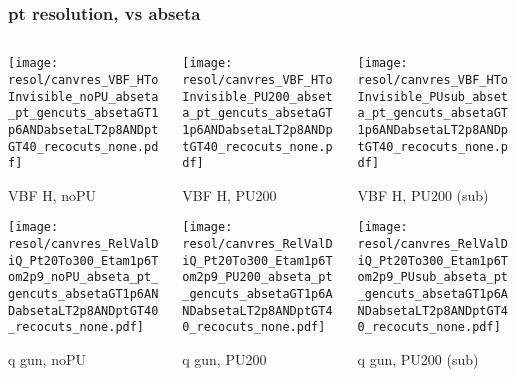 \documentclass[8pt]{beamer}
\begin{document}
  \begin{frame}
  \frametitle{pt resolution, vs abseta}
  
  \begin{columns}
   \begin{column}{0.35\textwidth}
     \texttt{[image: resol/canvres\_VBF\_HToInvisible\_noPU\_abseta\_pt\_gencuts\_absetaGT1p6ANDabsetaLT2p8ANDptGT40\_recocuts\_none.pdf]}
     
     VBF H, noPU
    
     \texttt{[image: resol/canvres\_RelValDiQ\_Pt20To300\_Etam1p6Tom2p9\_noPU\_abseta\_pt\_gencuts\_absetaGT1p6ANDabsetaLT2p8ANDptGT40\_recocuts\_none.pdf]}
     
     q gun, noPU
   \end{column}
   \begin{column}{0.35\textwidth}
     \texttt{[image: resol/canvres\_VBF\_HToInvisible\_PU200\_abseta\_pt\_gencuts\_absetaGT1p6ANDabsetaLT2p8ANDptGT40\_recocuts\_none.pdf]}
     
     VBF H, PU200
    
     \texttt{[image: resol/canvres\_RelValDiQ\_Pt20To300\_Etam1p6Tom2p9\_PU200\_abseta\_pt\_gencuts\_absetaGT1p6ANDabsetaLT2p8ANDptGT40\_recocuts\_none.pdf]}
     
     q gun, PU200
   \end{column}
   \begin{column}{0.35\textwidth}
     \texttt{[image: resol/canvres\_VBF\_HToInvisible\_PUsub\_abseta\_pt\_gencuts\_absetaGT1p6ANDabsetaLT2p8ANDptGT40\_recocuts\_none.pdf]}
     
     VBF H, PU200 (sub)
    
     \texttt{[image: resol/canvres\_RelValDiQ\_Pt20To300\_Etam1p6Tom2p9\_PUsub\_abseta\_pt\_gencuts\_absetaGT1p6ANDabsetaLT2p8ANDptGT40\_recocuts\_none.pdf]}
     
     q gun, PU200 (sub)
   \end{column}
  \end{columns}
 \end{frame}
 
\end{document}
